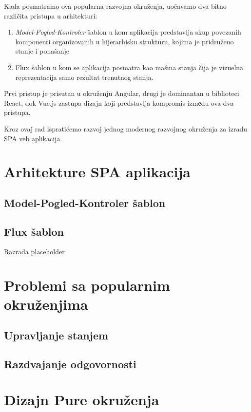 \documentclass[12pt,oneside]{memoir}
\begin{document}
Kada posmatramo ova popularna razvojna okruženja, uočavamo dva bitno različita pristupa u arhitekturi:
\begin{enumerate}
  \item {\emph{Model-Pogled-Kontroler}} šablon u kom aplikacija predstavlja skup povezanih komponenti organizovanih u hijerarhisku strukturu, kojima je pridruženo stanje i ponašanje
  \item Flux šablon u kom se aplikacija posmatra kao mašina stanja čija je vizuelna reprezentacija samo rezultat trenutnog stanja.
\end{enumerate}

Prvi pristup je prisutan u okruženju Angular, drugi je dominantan u biblioteci React, dok Vue.js zastupa dizajn koji predstavlja kompromis izmеđu ova dva pristupa.

Kroz ovaj rad ispratićemo razvoj jednog modernog razvojnog okruženja za izradu SPA veb aplikacija.


\chapter{Arhitekture SPA aplikacija}
\section{Model-Pogled-Kontroler šablon}

\section{Flux šablon}
Razrada placeholder
\chapter{Problemi sa popularnim okruženjima}
\section{Upravljanje stanjem}
\section{Razdvajanje odgovornosti}
\chapter{Dizajn Pure okruženja}
\end{document}
